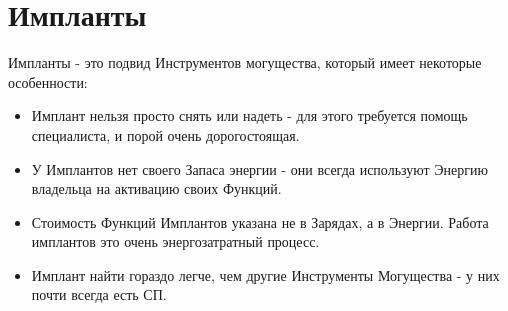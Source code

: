 \section{Импланты}
Импланты - это подвид Инструментов могущества, который имеет некоторые особенности:
\begin{itemize}
\item Имплант нельзя просто снять или надеть - для этого требуется помощь специалиста, и порой очень дорогостоящая.
\item У Имплантов нет своего Запаса энергии - они всегда используют Энергию владельца на активацию своих Функций.
\item Стоимость Функций Имплантов указана не в Зарядах, а в Энергии. Работа имплантов это очень энергозатратный процесс.
\item Имплант найти гораздо легче, чем другие Инструменты Могущества - у них почти всегда есть СП.
\end{itemize}


